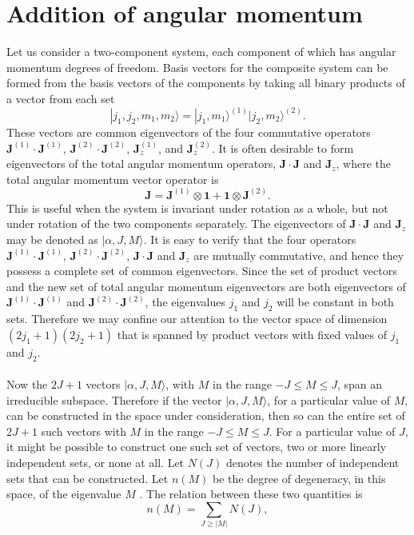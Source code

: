 \section{Addition of angular momentum}
Let us consider a two-component system, each component of which has angular momentum degrees of freedom. Basis vectors for the composite system can be formed from the basis vectors of the components by taking all binary products of a vector from each set
\[|j_1,j_2,m_1,m_2\rangle = |j_1,m_1\rangle ^{(1)} |j_2,m_2\rangle ^{(2)}.\]
These vectors are common eigenvectors of the four commutative operators $\bm{J}^{(1)}\cdot\bm{J}^{(1)}$, $\bm{J}^{(2)}\cdot\bm{J}^{(2)}$, $\bm{J}_z^{(1)}$, and $\bm{J}_z^{(2)}$.
It is often desirable to form eigenvectors of the total angular momentum operators, $\bm{J}\cdot\bm{J}$ and $\bm{J}_z$, where the total angular momentum vector operator is
\[\bm{J} = \bm{J}^{(1)}\otimes\bm{1} + \bm{1}\otimes\bm{J}^{(2)}.\]
This is useful when the system is invariant under rotation as a whole, but not under rotation of the two components separately. 
The eigenvectors of $\bm{J}\cdot\bm{J}$ and $\bm{J}_z$ may be denoted as $|\alpha, J, M \rangle$. It is easy to verify that the four operators $\bm{J}^{(1)}\cdot\bm{J}^{(1)}$, $\bm{J}^{(2)}\cdot\bm{J}^{(2)}$, $\bm{J}\cdot\bm{J}$ and $\bm{J}_z$ are mutually commutative, and hence they possess a complete set of common eigenvectors. 
Since the set of product vectors and the new set of total angular momentum eigenvectors are both eigenvectors of $\bm{J}^{(1)}\cdot\bm{J}^{(1)}$ and $\bm{J}^{(2)}\cdot\bm{J}^{(2)}$, the eigenvalues $j_1$ and $j_2$ will be constant in both sets. Therefore
we may confine our attention to the vector space of dimension $(2j_1+1)(2j_2+1)$ that is spanned by product vectors with fixed values of $j_1$ and $j_2$.
\\ \\
Now the $2J+1$ vectors $|\alpha, J, M \rangle$, with $M$ in the range $-J \leq M \leq J$, span an irreducible subspace.
Therefore if the vector $|\alpha, J, M \rangle$, for a particular value of $M$, can be constructed in the space under consideration, then so can the entire set of $2J+1$
such vectors with $M$ in the range $-J \leq M \leq J$.
For a particular value of $J$, it might be possible to construct one such set of vectors, two or more linearly independent sets, or none at all.
Let $N(J)$ denotes the number of independent sets that can be constructed. Let $n(M)$ be the degree of degeneracy, in this space, of the eigenvalue $M$ . The relation between these two quantities is
\[n(M) = \sum_{J \geq |M|} N(J),\]

